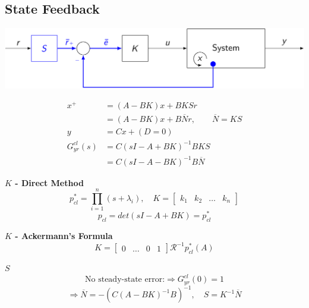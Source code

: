 \subsection{State Feedback}
\centerline{\includegraphics[width=0.95\linewidth]{src/3_state_feedback/images/state_feedback.jpeg}}
\begin{align*}
    x^+ &= (A-BK)x + BKSr\\
    &= (A-BK)x + B\overline{N}r, \qquad \overline{N} = KS\\
    y &= Cx + (D=0)\\[5pt]
    G_{yr}^{cl}(s) &= C(sI - A + BK)^{-1}BKS\\
    &= C(sI - A - BK)^{-1}B\overline{N}
\end{align*}

\textbf{$K$ - Direct Method}
$$
    p_{cl}^* = \prod_{i=1}^{n}(s + \lambda_i), \quad K = \begin{bmatrix} k_1 & k_2 & \hdots & k_n \end{bmatrix}
$$
$$
    p_{cl} = det(sI - A + BK) = p_{cl}^*
$$

\textbf{$K$ - Ackermann's Formula}
$$
    K = \begin{bmatrix} 0 & \hdots & 0 & 1 \end{bmatrix} \mathcal{R}^{-1}p_{cl}^*(A)
$$
\vspace*{0.1em}

\textbf{$S$}
$$
    \text{No steady-state error:} \Rightarrow G_{yr}^{cl}(0) = 1
$$
$$
    \Longrightarrow \overline{N} = - (C(A-BK)^{-1}B)^{-1}, \quad S = K^{-1}\overline{N}
$$
\vspace*{0.1em}